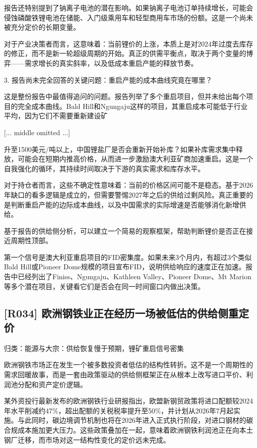 \documentclass[11pt]{ctexart}
\begin{document}
报告还特别提到了钠离子电池的潜在影响。如果钠离子电池订单持续增长，可能会侵蚀磷酸铁锂电池在储能、入门级乘用车和轻型商用车市场的份额。这是一个尚未被充分定价的长期变量。

对于产业决策者而言，这意味着：当前锂价的上涨，本质上是对2024年过度去库存的修正，而不是新一轮超级周期的开始。真正的供需平衡点，取决于两个变量的博弈——需求增长的真实斜率，以及低成本重启产能的释放节奏。

3. 报告尚未完全回答的关键问题：重启产能的成本曲线究竟在哪里？

这是整份报告中最值得追问的问题。报告列举了多个重启项目，但并未给出每个项目的完全成本曲线。Bald Hill和Ngungaju这样的项目，其重启成本可能低于行业平均，因为它们不需要重新建设矿

[... middle omitted ...]

升至1500美元/吨以上，中国锂盐厂是否会重新开始补库？如果补库需求集中释放，可能会在短期内推高价格，从而进一步激励澳大利亚矿商加速重启。这是一个自我强化的循环，其持续时间取决于下游的真实需求和库存水平。

对于持仓者而言，这些不确定性意味着：当前的价格区间可能不是稳态。基于2026年缺口的看多逻辑是成立的，但需要警惕2027年之后的供给过剩风险。真正重要的是判断重启产能的边际成本曲线，以及中国需求的实际增速是否能够消化新增供给。

基于报告的供给侧分析，可以建立一个简易的观察框架，帮助判断锂价是否正在接近周期性顶部。

第一个信号是澳大利亚重启项目的FID密集度。如果未来3个月内，有超过3个类似Bald Hill或Pioneer Dome规模的项目宣布FID，说明供给响应的速度正在加速。报告中已经列出了Finiss、Ngungaju、Kathleen Valley、Pioneer Dome、Mt Marion等多个潜在项目，关键看它们是否会在同一时间窗口内做出决策。

\subsection{[R034] 欧洲钢铁业正在经历一场被低估的供给侧重定价}
{\small\color{refgray}归类：能源与大宗：供给恢复慢于预期，锂矿重启信号密集}

欧洲钢铁市场正在发生一个被多数投资者低估的结构性转折。这不是一个周期性的需求回暖故事，而是一套由政策驱动的供给侧框架正在从根本上改写进口平价、利润池分配和资产定价逻辑。

某外资投行最新发布的欧洲钢铁行业研报指出，欧盟新钢贸政策将进口配额较2024年水平削减约47\%，超出配额的关税税率提升至50\%，并计划从2026年7月起实施。与此同时，碳边境调节机制也将在2026年进入正式执行阶段，对进口钢材的碳合规成本施加更大压力。这些政策叠加在一起，意味着欧洲钢铁利润池正在向本土钢厂迁移，而市场对这一结构性变化的定价远未完成。
\end{document}
